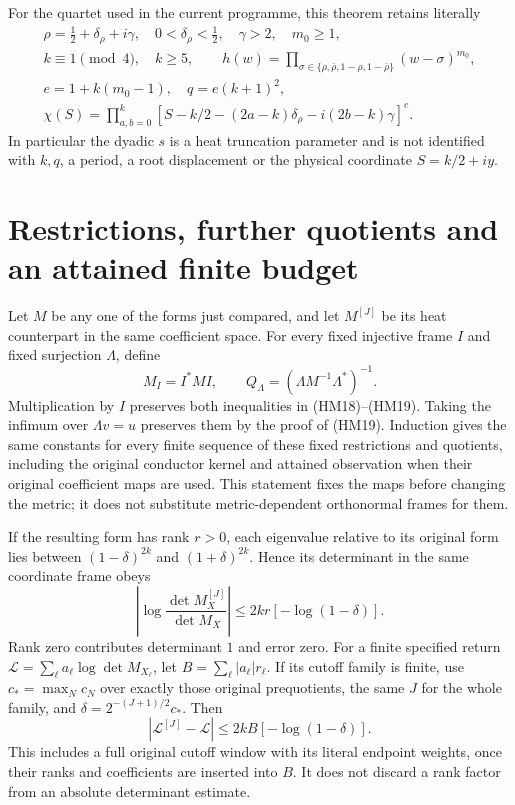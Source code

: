 \documentclass[11pt]{article}
\begin{document}
For the quartet used in the current programme, this theorem retains
literally
\begin{equation}\tag{HM20}
 \begin{gathered}
 \rho=\tfrac12+\delta_\rho+i\gamma,\quad
 0<\delta_\rho<\tfrac12,\quad\gamma>2,\quad m_0\ge1,\\
 k\equiv1\pmod4,\quad k\ge5,\qquad
 h(w)=\prod_{\sigma\in\{\rho,\bar\rho,1-\rho,1-\bar\rho\}}
                         (w-\sigma)^{m_0},\\
 e=1+k(m_0-1),\quad q=e(k+1)^2,\\
 \chi(S)=\prod_{a,b=0}^k
 [S-k/2-(2a-k)\delta_\rho-i(2b-k)\gamma]^e.
 \end{gathered}
\end{equation}
In particular the dyadic $s$ is a heat truncation parameter and is not
identified with $k,q$, a period, a root displacement or the physical
coordinate $S=k/2+iy$.

\section{Restrictions, further quotients and an attained finite budget}
Let $M$ be any one of the forms just compared, and let $M^{[J]}$ be
its heat counterpart in the same coefficient space. For every fixed
injective frame $I$ and fixed surjection $\Lambda$, define
\begin{equation}\tag{HM21}
 M_I=I^*MI,\qquad
 Q_\Lambda=(\Lambda M^{-1}\Lambda^*)^{-1}.
\end{equation}
Multiplication by $I$ preserves both inequalities in (HM18)--(HM19).
Taking the infimum over $\Lambda v=u$ preserves them by the proof of
(HM19). Induction gives the same constants for every finite sequence of
these fixed restrictions and quotients, including the original conductor
kernel and attained observation when their original coefficient maps
are used. This statement fixes the maps before changing the metric;
it does not substitute metric-dependent orthonormal frames for them.

If the resulting form has rank $r>0$, each eigenvalue relative to its
original form lies between $(1-\delta)^{2k}$ and $(1+\delta)^{2k}$.
Hence its determinant in the same coordinate frame obeys
\begin{equation}\tag{HM22}
 \left|\log\frac{\det M_X^{[J]}}{\det M_X}\right|
 \le 2kr[-\log(1-\delta)].
\end{equation}
Rank zero contributes determinant $1$ and error zero. For a finite
specified return $\mathcal L=\sum_\ell a_\ell\log\det M_{X_\ell}$,
let $B=\sum_\ell|a_\ell|r_\ell$. If its cutoff family is finite, use
$c_* =\max_N c_N$ over exactly those original prequotients, the same
$J$ for the whole family, and $\delta=2^{-(J+1)/2}c_*$. Then
\begin{equation}\tag{HM23}
 |\mathcal L^{[J]}-\mathcal L|\le2kB[-\log(1-\delta)].
\end{equation}
This includes a full original cutoff window with its literal endpoint
weights, once their ranks and coefficients are inserted into $B$.
It does not discard a rank factor from an absolute determinant estimate.
\end{document}
